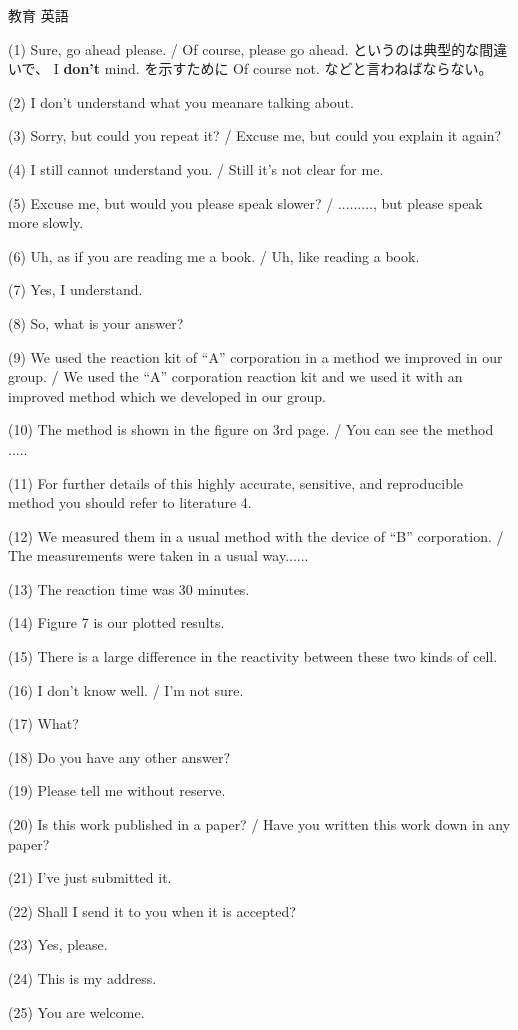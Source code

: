 \documentclass[fleqn]{jbook}
\begin{document}
\begin{answer}{教育 英語}{}
\begin{subanswers}
\baselineskip=12pt
\SubAnswer
\begin{list}{}{\itemindent=0mm \topsep=0mm }
  \item[(1)]  Sure, go ahead please. / Of course, please go ahead.
というのは典型的な間違いで、 I \textbf{don't} mind. を示すために Of course not. などと言わねばならない。
  \item[(2)]  I don't understand what you meanare talking about.
  \item[(3)]  Sorry, but could you repeat it? / Excuse me, but could you explain it again?
  \item[(4)]  I still cannot understand you. / Still it's not clear for me.
  \item[(5)]  Excuse me, but would you please speak slower? /  ........., but please speak more slowly.
  \item[(6)]  Uh, as if you are reading me a book. / Uh, like reading a book.
  \item[(7)]  Yes, I understand.
  \item[(8)]  So, what is your answer?
  \item[(9)]  We used the reaction kit of ``A'' corporation in a method we improved in our group. / We used the ``A'' corporation reaction kit and we used it with an improved method which we developed in our group.
  \item[(10)]  The method is shown in the figure on 3rd page. / You can see the method .....
  \item[(11)]  For further details of this highly accurate, sensitive, and reproducible method you should refer to literature 4.
  \item[(12)]  We measured them in a usual method with the device of ``B'' corporation. / The measurements were taken in a usual way......
  \item[(13)]  The reaction time was 30 minutes.
  \item[(14)]  Figure 7 is our plotted results.
  \item[(15)]  There is a large difference in the reactivity between these two kinds of cell.
  \item[(16)]  I don't know well. / I'm not sure.
  \item[(17)]  What?
  \item[(18)]  Do you have any other answer?
  \item[(19)]  Please tell me without reserve.
  \item[(20)]  Is this work published in a paper? / Have you written this work down in any paper?
  \item[(21)]  I've just submitted it.
  \item[(22)]  Shall I send it to you when it is accepted?
  \item[(23)]  Yes, please.
  \item[(24)]  This is my address.
  \item[(25)]  You are welcome.
  \end{list}
\baselineskip=15pt


\end{subanswers}
\end{answer}
\end{document}
